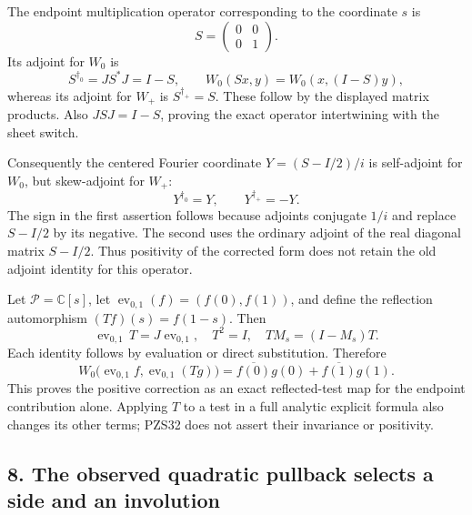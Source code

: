 \documentclass[
  10pt,
  a4paper,
]{article}
\begin{document}
The endpoint multiplication operator corresponding to the coordinate
\(s\) is \[
S=\begin{pmatrix}0&0\\0&1\end{pmatrix}.
\tag{PZS28}
\] Its adjoint for \(W_0\) is \[
S^{\dagger_0}=J S^*J=I-S,
\qquad W_0(Sx,y)=W_0(x,(I-S)y),
\tag{PZS29}
\] whereas its adjoint for \(W_+\) is \(S^{\dagger_+}=S\). These follow
by the displayed matrix products. Also \(JSJ=I-S\), proving the exact
operator intertwining with the sheet switch.

Consequently the centered Fourier coordinate \(Y=(S-I/2)/i\) is
self-adjoint for \(W_0\), but skew-adjoint for \(W_+\): \[
Y^{\dagger_0}=Y,\qquad Y^{\dagger_+}=-Y.
\tag{PZS30}
\] The sign in the first assertion follows because adjoints conjugate
\(1/i\) and replace \(S-I/2\) by its negative. The second uses the
ordinary adjoint of the real diagonal matrix \(S-I/2\). Thus positivity
of the corrected form does not retain the old adjoint identity for this
operator.

Let \(\mathcal P=\mathbb C[s]\), let
\(\operatorname{ev}_{0,1}(f)=(f(0),f(1))\), and define the reflection
automorphism \((Tf)(s)=f(1-s)\). Then \[
\operatorname{ev}_{0,1}\,T=J\operatorname{ev}_{0,1},
\quad T^2=I,\quad T M_s=(I-M_s)T.
\tag{PZS31}
\] Each identity follows by evaluation or direct substitution. Therefore
\[
W_0\bigl(\operatorname{ev}_{0,1}f,
\operatorname{ev}_{0,1}(Tg)\bigr)
=\overline{f(0)}g(0)+\overline{f(1)}g(1).
\tag{PZS32}
\] This proves the positive correction as an exact reflected-test map
for the endpoint contribution alone. Applying \(T\) to a test in a full
analytic explicit formula also changes its other terms; PZS32 does not
assert their invariance or positivity.

\subsection{8. The observed quadratic pullback selects a side and an
involution}\label{the-observed-quadratic-pullback-selects-a-side-and-an-involution}
\end{document}
